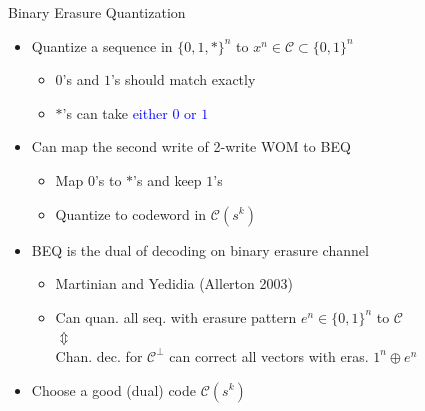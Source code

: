 \documentclass[10pt,presentation]{beamer}
\begin{document}
\begin{frame}{Binary Erasure Quantization}
  \begin{itemize}
  \item Quantize a sequence in $\{0,1,*\}^n$ to $x^n \in \mathcal{C} \subset \{0,1\}^n$
    \begin{itemize}
    \item $0$'s and $1$'s should \alert{match exactly}
    \item $*$'s can take \textcolor{blue}{either $0$ or $1$}
    \end{itemize}
    \vspace{0.25cm}
  \item Can map the second write of 2-write WOM to BEQ
    \begin{itemize}
    \item Map $0$'s to $*$'s and keep $1$'s
    \item Quantize to codeword in $\mathcal{C}(s^k)$
    \end{itemize}
\vspace{0.25cm}
  \item BEQ is the dual of decoding on binary erasure channel
    \begin{itemize}
    \item Martinian and Yedidia (Allerton 2003)
    \item Can quan. all seq. with erasure pattern $e^n \in \{0,1\}^n$ to $\mathcal{C}$ \\ \hspace{3.5cm} $\Updownarrow$ \\ Chan. dec. for $\mathcal{C}^{\perp}$ can correct all vectors with eras. $1^n \oplus e^n$
    \end{itemize}
    \vspace{0.25cm}
  \item Choose a good (dual) code $\mathcal{C}(s^k)$
  \end{itemize}
\end{frame}
\end{document}
